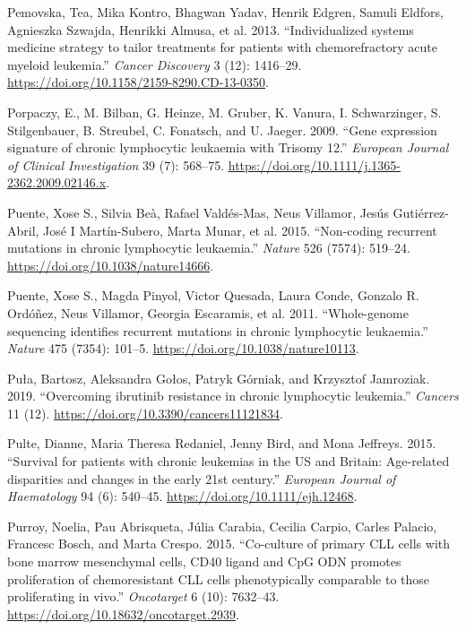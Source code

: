 \documentclass[11pt, a4paper, twosided]{book}
\newenvironment{CSLReferences}%
  {}%
  {\par}
\begin{document}
\begin{CSLReferences}{1}{0}
\leavevmode{}%
Pemovska, Tea, Mika Kontro, Bhagwan Yadav, Henrik Edgren, Samuli Eldfors, Agnieszka Szwajda, Henrikki Almusa, et al. 2013. {``{Individualized systems medicine strategy to tailor treatments for patients with chemorefractory acute myeloid leukemia}.''} \emph{Cancer Discovery} 3 (12): 1416--29. \url{https://doi.org/10.1158/2159-8290.CD-13-0350}.

\leavevmode{}%
Porpaczy, E., M. Bilban, G. Heinze, M. Gruber, K. Vanura, I. Schwarzinger, S. Stilgenbauer, B. Streubel, C. Fonatsch, and U. Jaeger. 2009. {``{Gene expression signature of chronic lymphocytic leukaemia with Trisomy 12}.''} \emph{European Journal of Clinical Investigation} 39 (7): 568--75. \url{https://doi.org/10.1111/j.1365-2362.2009.02146.x}.

\leavevmode{}%
Puente, Xose S., Silvia Beà, Rafael Valdés-Mas, Neus Villamor, Jesús Gutiérrez-Abril, José I Martín-Subero, Marta Munar, et al. 2015. {``{Non-coding recurrent mutations in chronic lymphocytic leukaemia}.''} \emph{Nature} 526 (7574): 519--24. \url{https://doi.org/10.1038/nature14666}.

\leavevmode{}%
Puente, Xose S., Magda Pinyol, Victor Quesada, Laura Conde, Gonzalo R. Ordóñez, Neus Villamor, Georgia Escaramis, et al. 2011. {``{Whole-genome sequencing identifies recurrent mutations in chronic lymphocytic leukaemia}.''} \emph{Nature} 475 (7354): 101--5. \url{https://doi.org/10.1038/nature10113}.

\leavevmode{}%
Puła, Bartosz, Aleksandra Gołos, Patryk Górniak, and Krzysztof Jamroziak. 2019. {``{Overcoming ibrutinib resistance in chronic lymphocytic leukemia}.''} \emph{Cancers} 11 (12). \url{https://doi.org/10.3390/cancers11121834}.

\leavevmode{}%
Pulte, Dianne, Maria Theresa Redaniel, Jenny Bird, and Mona Jeffreys. 2015. {``{Survival for patients with chronic leukemias in the US and Britain: Age-related disparities and changes in the early 21st century.}''} \emph{European Journal of Haematology} 94 (6): 540--45. \url{https://doi.org/10.1111/ejh.12468}.

\leavevmode{}%
Purroy, Noelia, Pau Abrisqueta, Júlia Carabia, Cecilia Carpio, Carles Palacio, Francesc Bosch, and Marta Crespo. 2015. {``{Co-culture of primary CLL cells with bone marrow mesenchymal cells, CD40 ligand and CpG ODN promotes proliferation of chemoresistant CLL cells phenotypically comparable to those proliferating in vivo}.''} \emph{Oncotarget} 6 (10): 7632--43. \url{https://doi.org/10.18632/oncotarget.2939}.


\end{CSLReferences}
\end{document}
